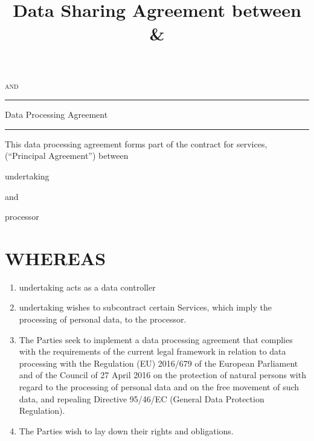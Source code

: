 \documentclass[a4paper]{article}
\title{Data Sharing Agreement between \Glsentrytext{undertaking} \& \Glsentrytext{processor}}
\begin{document}
\begin{titlepage}

\centering

\vspace{0.4\textheight}

\vspace{3cm}

\scshape{\Huge{}}

\vspace{0.1\textheight}

\Large\scshape{and}

\vspace{0.1\textheight}

\scshape{\Huge{}}

\vspace{0.2\textheight}


\rule{0.5\textwidth}{0.4pt}

Data Processing Agreement

\rule{0.5\textwidth}{0.4pt}

\end{titlepage}

\clearpage

This data processing agreement forms part of the contract for services, (``Principal Agreement'') between

\vspace{2em}

\Gls{undertaking}

\vspace{2em}

and

\vspace{2em}

\Gls{processor}

\vspace{2em}

\section*{WHEREAS}

\begin{enumerate}

	\item{\Gls{undertaking} acts as a data controller}
	\item{\Gls{undertaking} wishes to subcontract certain Services, which imply the processing of personal data, to the \gls{processor}.}
	\item{The Parties seek to implement a data processing agreement that complies with the requirements of the current legal framework in relation to data processing with the Regulation (EU) 2016/679 of the European Parliament and of the Council of 27 April 2016 on the protection of natural persons with regard to the processing of personal data and on the free movement of such data, and repealing Directive 95/46/EC (General Data Protection Regulation).}
	\item{The Parties wish to lay down their rights and obligations.}

\end{enumerate}
\end{document}

